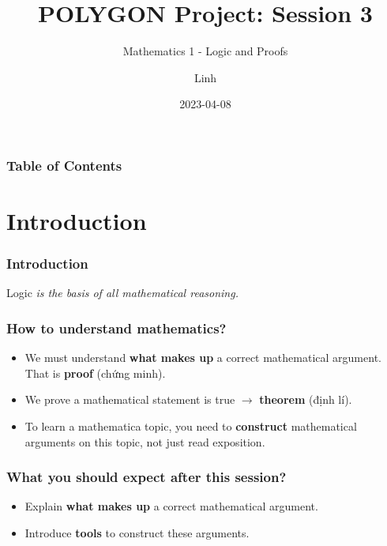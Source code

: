 \documentclass{beamer}
\title{POLYGON Project: Session 3}
\subtitle{Mathematics 1 - Logic and Proofs}
\author{Linh}
\date{2023-04-08}
\begin{document}
\frame{\titlepage}
\begin{frame}
    \frametitle{Table of Contents}
    \tableofcontents
    \end{frame}
\section{Introduction}
\begin{frame}
\frametitle{Introduction}

\begin{definition}{Logic}
    \textit{is the basis of all mathematical reasoning.}
    \end{definition}

\end{frame}
\begin{frame}
    \frametitle{How to understand mathematics?}
    \begin{itemize}
        \item We must understand \textbf{what makes up} a correct mathematical argument. That is \textbf{proof} (chứng minh).

        \item We prove a mathematical statement is true $\longrightarrow$ \textbf{theorem} (định lí).

        \item To learn a mathematica topic, you need to \textbf{construct} mathematical arguments on this topic, not just read exposition.
    \end{itemize}
    \end{frame}
\begin{frame}
    \frametitle{What you should expect after this session?}
        \begin{itemize}
            \item Explain \textbf{what makes up} a correct mathematical argument.
            \item Introduce \textbf{tools} to construct these arguments.
        \end{itemize}
    \end{frame}
\end{document}

